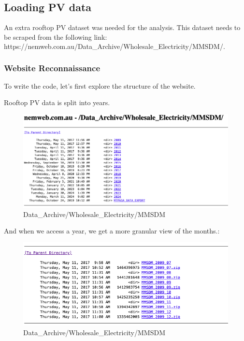 \documentclass[mstat,12pt]{unswthesis}
\begin{document}
\subsection{Loading PV data}\label{loading-pv-data}

An extra rooftop PV dataset was needed for the analysis. This dataset
needs to be scraped from the following link:
https://nemweb.com.au/Data\_Archive/Wholesale\_Electricity/MMSDM/.

\subsubsection{Website Reconnaissance}\label{website-reconnaissance}

To write the code, let's first explore the structure of the website.

Rooftop PV data is split into years.

\begin{figure}
\centering
\includegraphics{img/nemweb-1.png}
\caption{Data\_Archive/Wholesale\_Electricity/MMSDM}
\end{figure}

And when we access a year, we get a more granular view of the months.:

\begin{figure}
\centering
\includegraphics{img/nemweb-2.png}
\caption{Data\_Archive/Wholesale\_Electricity/MMSDM}
\end{figure}
\end{document}
